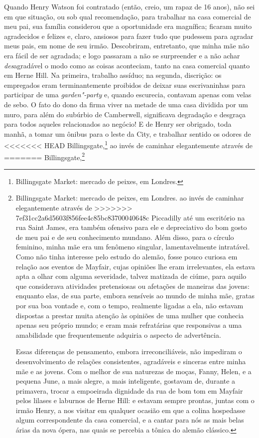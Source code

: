 {{{{{{{{{{{{{{{{{{{{{{{{{{{{{{{{{{{{{{{{{{{{{{{{{{{{{{{{{{{{{{{{{{{{{{{{%
Quando Henry Watson foi contratado (então, creio, um rapaz de 16
anos), não sei em que situação, ou sob qual recomendação, para trabalhar
na casa comercial de meu pai, sua família considerou que a oportunidade
era magnífica; ficaram muito agradecidos e felizes e, claro, ansiosos
para fazer tudo que pudessem para agradar meus pais, em nome de seu
irmão. Descobriram, entretanto, que minha mãe não era fácil de ser
agradada; e logo passaram a não se surpreender e a não achar
\textit{des}agradável o modo como as coisas aconteciam, tanto na casa
comercial quanto em Herne Hill. Na primeira, trabalho assíduo; na
segunda, discrição: os empregados eram terminantemente proibidos de
deixar suas escrivaninhas para participar de uma \textit{garden"-party} e,
quando escurecia, contavam apenas com velas de sebo. O fato do dono da
firma viver na metade de uma casa dividida por um muro, para além do
subúrbio de Camberwell, significava degradação e desgraça para todos
aqueles relacionados ao negócio! E de Henry ser obrigado, toda manhã, a
tomar um ônibus para o leste da City, e trabalhar sentido os odores de
<<<<<<< HEAD
Billingsgate,\footnote{Billingsgate Market: mercado de peixes, em Londres.} ao invés de caminhar elegantemente através de
=======
Billingsgate,\footnote{Billingsgate Market: mercado de peixes, em Londres.
   ao invés de caminhar elegantemente através de
>>>>>>> 7ef31cc2a6d5603f856fee4c85bc83700040648c
Piccadilly até um escritório na rua Saint James, era também ofensivo
para ele e depreciativo do bom gosto de meu pai e de seu conhecimento
mundano. Além disso, para o círculo feminino, minha mãe era um fenômeno
singular, lamentavelmente intratável. Como não tinha interesse pelo
estudo do alemão, fosse pouco curiosa em relação aos eventos de Mayfair,
cujas opiniões lhe eram irrelevantes, ela estava apta a olhar com alguma
severidade, talvez matizada de ciúme, para aquilo que considerava
atividades pretensiosas ou afetações de maneiras das jovens: enquanto
elas, de sua parte, embora sensíveis ao mundo de minha mãe, gratas por
sua boa vontade e, com o tempo, realmente ligadas a ela, não estavam
dispostas a prestar muita atenção às opiniões de uma mulher que conhecia
apenas seu próprio mundo; e eram mais refratárias que responsivas a uma
amabilidade que frequentemente adquiria o aspecto de advertência.

Essas diferenças de pensamento, embora irreconciliáveis, não
impediram o desenvolvimento de relações consistentes, agradáveis e
sinceras entre minha mãe e as jovens. Com o melhor de sua naturezas de
moças, Fanny, Helen, e a pequena June, a mais alegre, a mais
inteligente, gostavam de, durante a primavera, trocar a empoeirada
dignidade da rua de bom tom em Mayfair pelos lilases e laburnos de Herne
Hill: e estavam sempre prontas, juntas com o irmão Henry, a nos visitar
em qualquer ocasião em que a colina hospedasse algum correspondente da
casa comercial, e a cantar para nós as mais belas árias da nova ópera,
nas quais se percebia a tônica do alemão clássico.

}}}}}}}}}}}}}}}}}}}}}}}}}}}}}}}}}}}}}}}}}}}}}}}}}}}}}}}}}}}}}}}}}}}}}}}}}
